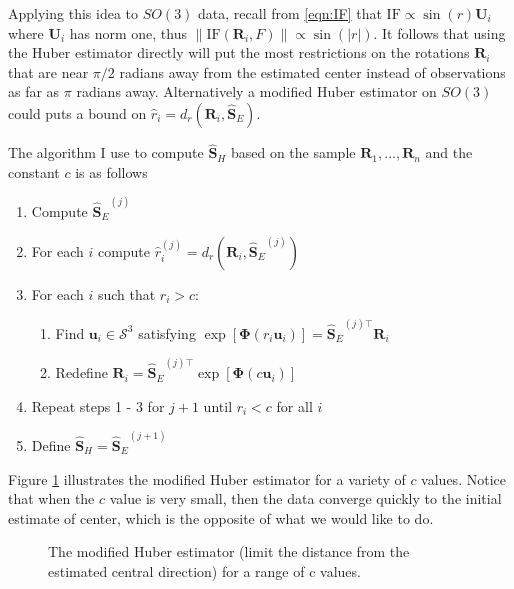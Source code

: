 \documentclass{article}\usepackage[]{graphicx}\usepackage[]{color}
\newcommand{\ProjMean}{{\widehat{\bm S}_{E}}}
\newcommand{\HuberMean}{{\widehat{\bm S}_H}}
\begin{document}
Applying this idea to $SO(3)$ data, recall from \eqref{eqn:IF} that $\text{IF}\propto\sin(r)\bm U_i$ where $\bm U_i$ has norm one, thus $\|\text{IF}(\bm R_i,F)\|\propto \sin(|r|)$.  It follows that using the Huber estimator directly will put the most restrictions on the rotations $\bm R_i$ that are near $\pi/2$ radians away from the estimated center instead of observations as far as $\pi$ radians away.  Alternatively a modified Huber estimator on $SO(3)$ could puts a bound on $\hat r_i=d_r(\bm R_i,\ProjMean)$.  

The algorithm I use to compute $\HuberMean$ based on the sample $\bm R_1,\dots,\bm R_n$ and the constant $c$ is as follows
\begin{enumerate} 
\item Compute $\ProjMean^{(j)}$
\item For each $i$ compute $\hat r_i^{(j)}=d_r(\bm R_i,\ProjMean^{(j)})$
\item For each $i$ such that $r_i>c$:
\begin{enumerate}
\item Find $\bm u_i\in\mathcal{S}^3$ satisfying $\exp[\bm{\Phi}(r_i\bm u_i)]=\ProjMean^{(j)\top}\bm R_i$
\item Redefine $\bm R_i=\ProjMean^{(j)\top}\exp[\bm{\Phi}(c\bm u_i)]$
\end{enumerate}
\item Repeat steps 1 - 3 for $j+1$ until $r_i<c$ for all $i$
\item Define $\HuberMean=\ProjMean^{(j+1)}$
\end{enumerate}
Figure \ref{fig:huberContd} illustrates the modified Huber estimator for a variety of $c$ values.  Notice that when the $c$ value is very small, then the data converge quickly to the initial estimate of center, which is the opposite of what we would like to do.

\begin{figure}[h]
\begin{center}
\end{center}
\caption{The modified Huber estimator (limit the distance from the estimated central direction) for a range of c values.}
\label{fig:huberContd}
\end{figure}
\end{document}
